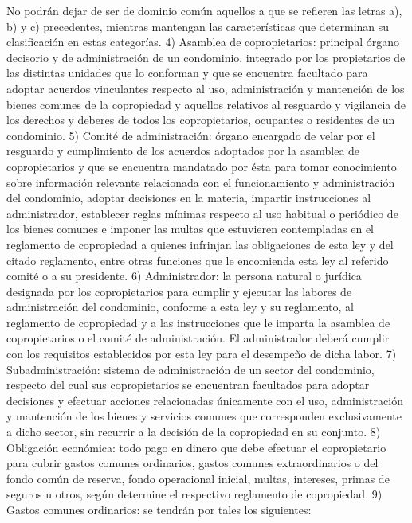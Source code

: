     No podrán dejar de ser de dominio común aquellos a que se refieren las letras a), b) y c) precedentes, mientras mantengan las características que determinan su clasificación en estas categorías.
    4) Asamblea de copropietarios: principal órgano decisorio y de administración de un condominio, integrado por los propietarios de las distintas unidades que lo conforman y que se encuentra facultado para adoptar acuerdos vinculantes respecto al uso, administración y mantención de los bienes comunes de la copropiedad y aquellos relativos al resguardo y vigilancia de los derechos y deberes de todos los copropietarios, ocupantes o residentes de un condominio.
    5) Comité de administración: órgano encargado de velar por el resguardo y cumplimiento de los acuerdos adoptados por la asamblea de copropietarios y que se encuentra mandatado por ésta para tomar conocimiento sobre información relevante relacionada con el funcionamiento y administración del condominio, adoptar decisiones en la materia, impartir instrucciones al administrador, establecer reglas mínimas respecto al uso habitual o periódico de los bienes comunes e imponer las multas que estuvieren contempladas en el reglamento de copropiedad a quienes infrinjan las obligaciones de esta ley y del citado reglamento, entre otras funciones que le encomienda esta ley al referido comité o a su presidente.
    6) Administrador: la persona natural o jurídica designada por los copropietarios para cumplir y ejecutar las labores de administración del condominio, conforme a esta ley y su reglamento, al reglamento de copropiedad y a las instrucciones que le imparta la asamblea de copropietarios o el comité de administración. El administrador deberá cumplir con los requisitos establecidos por esta ley para el desempeño de dicha labor.
    7) Subadministración: sistema de administración de un sector del condominio, respecto del cual sus copropietarios se encuentran facultados para adoptar decisiones y efectuar acciones relacionadas únicamente con el uso, administración y mantención de los bienes y servicios comunes que corresponden exclusivamente a dicho sector, sin recurrir a la decisión de la copropiedad en su conjunto.
    8) Obligación económica: todo pago en dinero que debe efectuar el copropietario para cubrir gastos comunes ordinarios, gastos comunes extraordinarios o del fondo común de reserva, fondo operacional inicial, multas, intereses, primas de seguros u otros, según determine el respectivo reglamento de copropiedad.
    9) Gastos comunes ordinarios: se tendrán por tales los siguientes:
     
